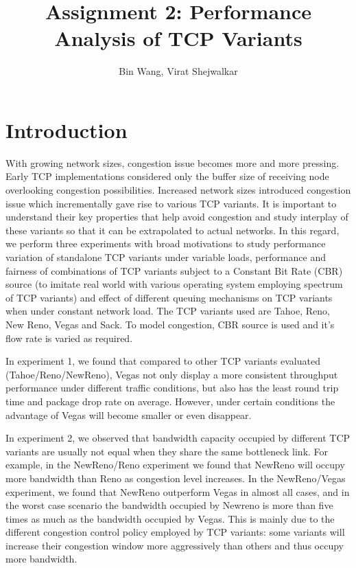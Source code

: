 \documentclass[USenglish,oneside,twocolumn]{article}
\begin{document}
 
\author[1]{Bin Wang, Virat Shejwalkar}

\title{\Large Assignment 2: Performance Analysis of TCP Variants}


  
 

\maketitle
\section{Introduction}
With growing network sizes, congestion issue becomes more and more pressing. Early TCP implementations considered only the buffer size of receiving node overlooking congestion possibilities. Increased network sizes introduced congestion issue which incrementally gave rise to various TCP variants. It is important to understand their key properties that help avoid congestion and study interplay of these variants so that it can be extrapolated to actual networks. In this regard, we perform three experiments with broad motivations to study performance variation of standalone TCP variants under variable loads, performance and fairness of combinations of TCP variants subject to a Constant Bit Rate (CBR) source (to imitate real world with various operating system employing spectrum of TCP variants) and effect of different queuing mechanisms on TCP variants when under constant network load. The TCP variants used are Tahoe, Reno, New Reno, Vegas and Sack. To model congestion, CBR source is used and it's flow rate is varied as required.

In experiment 1, we found that compared to other TCP variants evaluated (Tahoe/Reno/NewReno), Vegas not only display a more consistent throughput performance under different traffic conditions, but also has the least round trip time and package drop rate on average. However, under certain conditions the advantage of Vegas will become smaller or even disappear.

In experiment 2, we observed that bandwidth capacity occupied by different TCP variants are usually not equal when they share the same bottleneck link. For example, in the NewReno/Reno experiment we found that NewReno will occupy more bandwidth than Reno as congestion level increases. In the NewReno/Vegas experiment, we found that NewReno outperform Vegas in almost all cases, and in the worst case scenario the bandwidth occupied by Newreno is more than five times as much as the bandwidth occupied by Vegas. This is mainly due to the different congestion control policy employed by TCP variants: some variants will increase their congestion window more aggressively than others and thus occupy more bandwidth.
\end{document}
